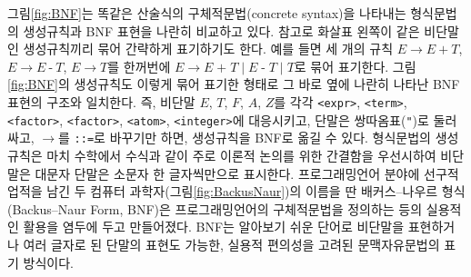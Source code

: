 그림\;\ref{fig:BNF}는 똑같은 산술식의 구체적문법(concrete syntax)을
나타내는 형식문법의 생성규칙과 BNF 표현을 나란히 비교하고 있다.
참고로 화살표 왼쪽이 같은 비단말인 생성규칙끼리 묶어 간략하게 표기하기도 한다.
예를 들면 세 개의 규칙
$E \to E ~\texttt{+}~ T$, $E \to E ~\texttt{-}~ T$, $E \to T$를
한꺼번에 $E \to E\;\texttt{+}\;T \mid E\;\texttt{-}\;T \mid T$로
묶어 표기한다. 그림\;\ref{fig:BNF}의 생성규칙도 이렇게 묶어 표기한 형태로
그 바로 옆에 나란히 나타난 BNF 표현의 구조와 일치한다.
즉, 비단말 $E$, $T$, $F$, $A$, $Z$를 각각 \texttt{<expr>},
\texttt{<term>}, \texttt{<factor>}, \texttt{<factor>},
\texttt{<atom>}, \texttt{<integer>}에 대응시키고, 단말은
쌍따옴표(\texttt{"})로 둘러싸고, $\to$를 \texttt{::=}로
바꾸기만 하면, 생성규칙을 BNF로 옮길 수 있다. 형식문법의 생성규칙은
마치 수학에서 수식과 같이 주로 이론적 논의를 위한 간결함을 우선시하여
비단말은 대문자 단말은 소문자 한 글자씩만으로 표시한다.
프로그래밍언어 분야에 선구적 업적을 남긴
두 컴퓨터 과학자(그림\;\ref{fig:BackusNaur})의 이름을 딴
배커스--나우르 형식(Backus--Naur Form, BNF)은 프로그래밍언어의
구체적문법을 정의하는 등의 실용적인 활용을 염두에 두고 만들어졌다.
BNF는 알아보기 쉬운 단어로 비단말을 표현하거나 여러 글자로 된 단말의
표현도 가능한, 실용적 편의성을 고려된 문맥자유문법의 표기 방식이다.

